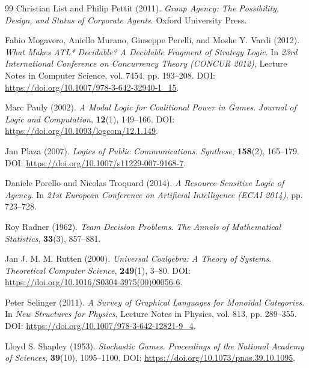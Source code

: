 \documentclass[11pt,a4paper]{article}
\numberwithin{equation}{section}
\theoremstyle{definition}
\theoremstyle{remark}
\theoremstyle{plain}
\begin{document}
\begin{thebibliography}{99}
Christian List and Philip Pettit (2011).
\newblock \emph{Group Agency: The Possibility, Design, and Status of Corporate Agents}.
\newblock Oxford University Press.

Fabio Mogavero, Aniello Murano, Giuseppe Perelli, and Moshe Y. Vardi (2012).
\newblock \emph{What Makes ATL* Decidable? A Decidable Fragment of Strategy Logic}.
\newblock In \emph{23rd International Conference on Concurrency Theory (CONCUR 2012)}, Lecture Notes in Computer Science, vol. 7454, pp. 193--208.
\newblock DOI: \url{https://doi.org/10.1007/978-3-642-32940-1_15}.

Marc Pauly (2002).
\newblock \emph{A Modal Logic for Coalitional Power in Games}.
\newblock \emph{Journal of Logic and Computation}, \textbf{12}(1), 149--166.
\newblock DOI: \url{https://doi.org/10.1093/logcom/12.1.149}.

Jan Plaza (2007).
\newblock \emph{Logics of Public Communications}.
\newblock \emph{Synthese}, \textbf{158}(2), 165--179.
\newblock DOI: \url{https://doi.org/10.1007/s11229-007-9168-7}.

Daniele Porello and Nicolas Troquard (2014).
\newblock \emph{A Resource-Sensitive Logic of Agency}.
\newblock In \emph{21st European Conference on Artificial Intelligence (ECAI 2014)}, pp. 723--728.

Roy Radner (1962).
\newblock \emph{Team Decision Problems}.
\newblock \emph{The Annals of Mathematical Statistics}, \textbf{33}(3), 857--881.

Jan J. M. M. Rutten (2000).
\newblock \emph{Universal Coalgebra: A Theory of Systems}.
\newblock \emph{Theoretical Computer Science}, \textbf{249}(1), 3--80.
\newblock DOI: \url{https://doi.org/10.1016/S0304-3975(00)00056-6}.

Peter Selinger (2011).
\newblock \emph{A Survey of Graphical Languages for Monoidal Categories}.
\newblock In \emph{New Structures for Physics}, Lecture Notes in Physics, vol. 813, pp. 289--355.
\newblock DOI: \url{https://doi.org/10.1007/978-3-642-12821-9_4}.

Lloyd S. Shapley (1953).
\newblock \emph{Stochastic Games}.
\newblock \emph{Proceedings of the National Academy of Sciences}, \textbf{39}(10), 1095--1100.
\newblock DOI: \url{https://doi.org/10.1073/pnas.39.10.1095}.


\end{thebibliography}
\end{document}
